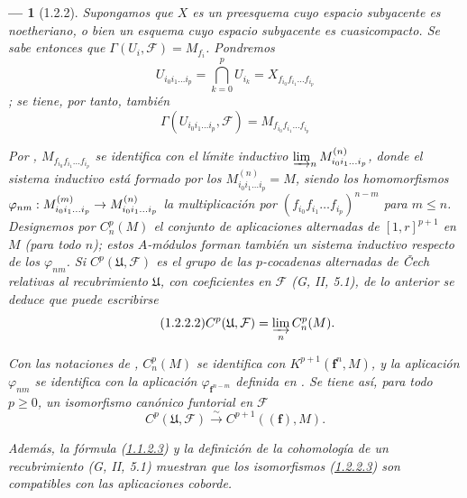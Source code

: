 \documentclass[10pt,oneside,openany]{book}
\theoremstyle{egaenv}\newtheorem*{env}{---}
\theoremstyle{egastatement}
\theoremstyle{egadescription}
\renewcommand{\leq}{\leqslant}
\renewcommand{\geq}{\geqslant}
\renewcommand{\to}{\mathchoice{\longrightarrow}{\rightarrow}{\rightarrow}{\rightarrow}}
\begin{document}
\begin{env}[1.2.2]
\label{III.1.2.2}
\label{III.1.2.2-fr}
Supongamos que $X$ es un preesquema cuyo espacio subyacente es \emph{noetheriano}, o bien un \emph{esquema} cuyo espacio subyacente es \emph{cuasicompacto}.
Se sabe entonces  que $\Gamma(U_i,\mathcal F)=M_{f_i}$. Pondremos \[
U_{i_0i_1\ldots i_p}=\bigcap_{k=0}^p U_{i_k}
=X_{f_{i_0}f_{i_1}\ldots f_{i_p}}
\]
; se tiene, por tanto, también
\begin{equation}
\label{III.1.2.2.1-fr}
\tag{1.2.2.1}
\Gamma(U_{i_0i_1\ldots i_p},\mathcal F)=M_{f_{i_0}f_{i_1}\ldots f_{i_p}}
\end{equation}

Por , $M_{f_{i_0}f_{i_1}\ldots f_{i_p}}$ se identifica con el límite inductivo $\varinjlim_n M_{i_0i_1\ldots i_p}^{(n)}$, donde el sistema inductivo está formado por los $M_{i_0i_1\ldots i_p}^{(n)}=M$, siendo los homomorfismos $\varphi_{nm}:M_{i_0i_1\ldots i_p}^{(m)}\to
M_{i_0i_1\ldots i_p}^{(n)}$ la multiplicación por $(f_{i_0}f_{i_1}\ldots f_{i_p})^{n-m}$ para $m\leq n$. Designemos por $C_n^p(M)$ el conjunto de aplicaciones \emph{alternadas} de $[1,r]^{p+1}$ en $M$ (para todo $n$); estos $A$-módulos forman también un sistema inductivo respecto de los $\varphi_{nm}$.
Si $C^p(\mathfrak U,\mathcal F)$ es el grupo de las $p$-cocadenas \emph{alternadas} de \v Cech relativas al recubrimiento $\mathfrak U$, con coeficientes en $\mathcal F$ (G, II, 5.1), de lo anterior se deduce que puede escribirse
\begin{equation}
\label{III.1.2.2.2-fr}
\tag{1.2.2.2}
C^p(\mathfrak U,\mathcal F)=\varinjlim_n C_n^p(M).
\end{equation}

Con las notaciones de , $C_n^p(M)$ se identifica con $K^{p+1}(\mathbf f^n,M)$, y la aplicación $\varphi_{nm}$ se identifica con la aplicación $\varphi_{\mathbf f^{n-m}}$ definida en .
Se tiene así, para todo $p\geq0$, un isomorfismo canónico funtorial en $\mathcal F$
\begin{equation}
\label{III.1.2.2.3-fr}
\tag{1.2.2.3}
C^p(\mathfrak U,\mathcal F)\xrightarrow{\sim}C^{p+1}((\mathbf f),M).
\end{equation}

Además, la fórmula (\hyperref[III.1.1.2.3]{1.1.2.3}) y la definición de la cohomología de un recubrimiento (G, II, 5.1) muestran que los isomorfismos (\hyperref[III.1.2.2.3]{1.2.2.3}) son compatibles con las aplicaciones coborde.
\end{env}
\end{document}
